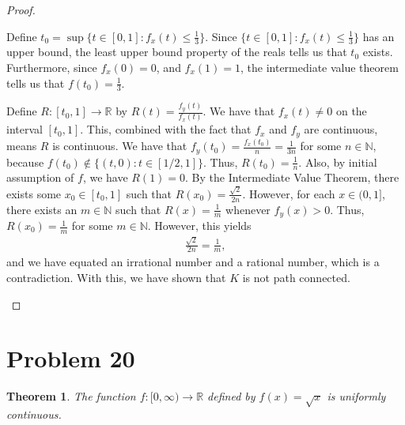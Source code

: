 \documentclass[10pt,a4paper]{article}
\theoremstyle{theorem}
\newtheorem{theorem}{Theorem}
\theoremstyle{definition}
\begin{document}
\begin{proof}
\begin{enumerate}
Define $t_0 = \sup \{t \in [0, 1] : f_x(t) \leq \frac{1}{3}\}$. Since $\{t \in [0, 1] : f_x(t) \leq \frac{1}{3}\}$ has an upper bound, the least upper bound property of the reals tells us that $t_0$ exists.  Furthermore, since $f_x(0) = 0$, and $f_x(1) = 1$, the intermediate value theorem tells us that $f(t_0) = \frac{1}{3}$.  

Define $R:[t_0, 1] \to \mathbb{R}$ by $R(t) = \frac{f_y(t)}{f_x(t)}$.  We have that $f_x(t) \not = 0$ on the interval $[t_0, 1]$. This, combined with the fact that $f_x$ and $f_y$ are continuous, means $R$ is continuous.  We have that $f_y(t_0) = \frac{f_x(t_0)}{n} = \frac{1}{3n}$ for some $n \in \mathbb{N}$, because $f(t_0) \not \in \{(t, 0): t \in [1/2, 1]\}$.  Thus, $R(t_0) = \frac{1}{n}$. Also, by initial assumption of $f$, we have $R(1) = 0$. By the Intermediate Value Theorem, there exists some $x_0 \in [t_0, 1]$ such that $R(x_0) = \frac{\sqrt{2}}{2n}$. However, for each $x \in (0, 1]$,  there exists an $m \in \mathbb{N}$ such that $R(x) = \frac{1}{m}$ whenever $f_y(x) > 0$. Thus, $R(x_0) = \frac{1}{m}$ for some $m \in \mathbb{N}$. However, this yields
\begin{align*}
\frac{\sqrt{2}}{2n} = \frac{1}{m},
\end{align*}
and we have equated an irrational number and a rational number, which is a contradiction.  With this, we have shown that $K$ is not path connected.
\end{enumerate}
\end{proof}

\section*{Problem 20}
\begin{theorem}
The function $f:[0, \infty) \to \mathbb{R}$ defined by $f(x) = \sqrt{x}$ is uniformly continuous.
\end{theorem}
 
\end{document}

